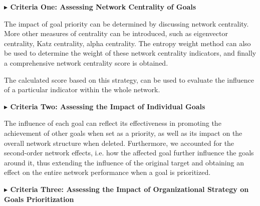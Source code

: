 \documentclass[12pt]{article}  %
\begin{document}
\vspace{0.7mm}\begin{itshape}
\textbf{$\blacktriangleright$
Criteria One: Assessing Network Centrality of Goals
}\end{itshape}

The impact of goal priority can be determined by discussing network centrality. %
More other measures of centrality can be introduced, such as eigenvector centrality, Katz centrality, alpha centrality. 
The entropy weight method can also be used to determine the weight of these network centrality indicators, and finally a comprehensive network centrality score is obtained.


The calculated score based on this strategy, can be used to evaluate the influence of a particular indicator within the whole network.

\vspace{0.7mm}\begin{itshape}
\textbf{$\blacktriangleright$
Criteria Two: Assessing  the Impact of Individual Goals
}\end{itshape}

The influence of each goal can reflect its effectiveness in promoting the achievement of other goals when set as a priority, as well as its impact on the overall network structure when deleted. Furthermore, we accounted for the second-order network effects, i.e. how the affected goal further influence the goals around it, thus extending the influence of the original target and obtaining an effect on the entire network performance when a goal is prioritized.

\vspace{0.7mm}\begin{itshape}
\textbf{$\blacktriangleright$ Criteria Three: Assessing the Impact of Organizational Strategy on Goals Prioritization}\end{itshape}
\end{document}

